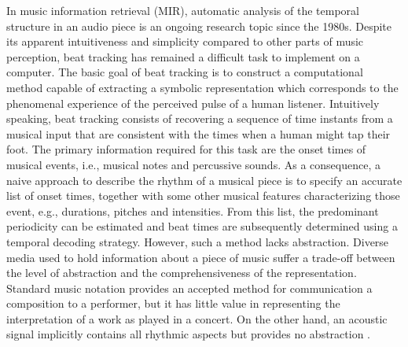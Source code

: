 \documentclass{scrartcl}
\begin{document}
In music information retrieval (MIR), automatic analysis of the temporal structure in an audio piece is an ongoing research topic since the 1980s. Despite its apparent intuitiveness and simplicity compared to other parts of music perception, beat tracking has remained a difficult task to implement on a computer. The basic goal of beat tracking is to construct a computational method capable of extracting a symbolic representation which corresponds to the phenomenal experience of the perceived pulse of a human listener. Intuitively speaking, beat tracking consists of recovering a sequence of time instants from a musical input that are consistent with the times when a human might tap their foot. The primary information required for this task are the onset times of musical events, i.e., musical notes and percussive sounds. As a consequence, a naive approach to describe the rhythm of a musical piece is to specify an accurate list of onset times, together with some other musical features characterizing those event, e.g., durations, pitches and intensities. From this list, the predominant periodicity can be estimated and beat times are subsequently determined using a temporal decoding strategy. However, such a method lacks abstraction. Diverse media used to hold information about a piece of music suffer a trade-off between the level of abstraction and the comprehensiveness of the representation. Standard music notation provides an accepted method for communication a composition to a performer, but it has little value in representing the interpretation of a work as played in a concert. On the other hand, an acoustic signal implicitly contains all rhythmic aspects but provides no abstraction \cite{Gouyon2005}.

\end{document}
